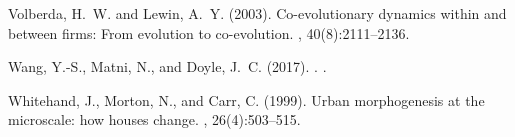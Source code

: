 \documentclass[letterpaper]{article}
\begin{document}
\begin{thebibliography}{}
Volberda, H.~W. and Lewin, A.~Y. (2003).
\newblock Co-evolutionary dynamics within and between firms: From evolution to
  co-evolution.
, 40(8):2111--2136.

{Wang}, Y.-S., {Matni}, N., and {Doyle}, J.~C. (2017).
.
.

Whitehand, J., Morton, N., and Carr, C. (1999).
\newblock Urban morphogenesis at the microscale: how houses change.
,
  26(4):503--515.

\end{thebibliography}
\end{document}
